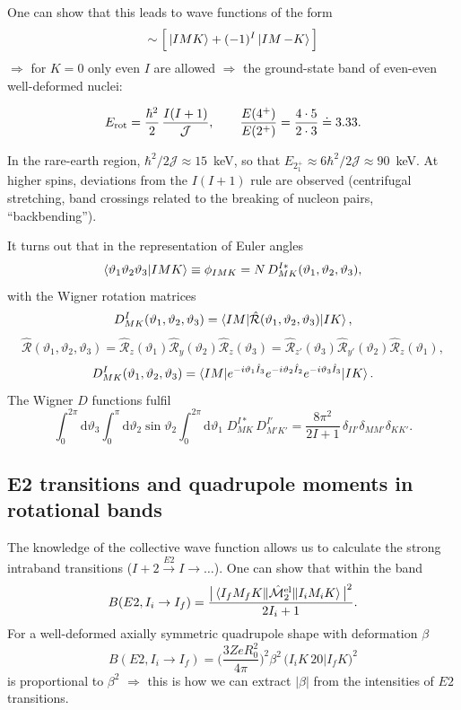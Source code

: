 \documentclass[11pt,a4paper]{article}
\newcommand{\op}[1]{\hat{#1}}
\newcommand{\ud}{\mathrm{d}}
\begin{document}
One can show that this leads to wave functions of the form
\[
\sim\Big[\ket{IMK}+(-1)^I\ket{IM\,{-K}}\Big]
\]
$\Rightarrow$ for $K=0$ only even $I$ are allowed $\Rightarrow$ the ground-state band of even-even well-deformed nuclei:
\begin{center}
\end{center}
\[
E_{\rm rot}=\frac{\hbar^2}{2}\,\frac{I(I+1)}{\mathcal J},\qquad
\frac{E(4^+)}{E(2^+)}=\frac{4\cdot5}{2\cdot3}\doteq3.33 .
\]

In the rare-earth region, $\hbar^2/2\mathcal J\approx15$~keV, so that $E_{2^+_1}\approx6\hbar^2/2\mathcal J\approx90$~keV. At higher spins, deviations from the $I(I+1)$ rule are observed (centrifugal stretching, band crossings related to the breaking of nucleon pairs, ``backbending'').

It turns out that in the representation of Euler angles
\[
\braket{\vartheta_1\vartheta_2\vartheta_3|IMK}\equiv\phi_{IMK}=N\,D^{I*}_{MK}(\vartheta_1,\vartheta_2,\vartheta_3),
\]
with the Wigner rotation matrices
\[
D^I_{MK}(\vartheta_1,\vartheta_2,\vartheta_3)=\braket{IM|\op{\mathcal R}(\vartheta_1,\vartheta_2,\vartheta_3)|IK},
\]
\[
\op{\mathcal R}(\vartheta_1,\vartheta_2,\vartheta_3)=\op{\mathcal R}_z(\vartheta_1)\op{\mathcal R}_y(\vartheta_2)\op{\mathcal R}_z(\vartheta_3)
=\op{\mathcal R}_{z'}(\vartheta_3)\op{\mathcal R}_{y'}(\vartheta_2)\op{\mathcal R}_z(\vartheta_1),
\]
\[
D^I_{MK}(\vartheta_1,\vartheta_2,\vartheta_3)=\braket{IM|e^{-i\vartheta_1\op I_3}e^{-i\vartheta_2\op I_2}e^{-i\vartheta_3\op I_3}|IK}.
\]
The Wigner $D$ functions fulfil
\[
\int_0^{2\pi}\ud\vartheta_3\int_0^\pi\ud\vartheta_2\sin\vartheta_2\int_0^{2\pi}\ud\vartheta_1\;D^{I*}_{MK}\,D^{I'}_{M'K'}=\frac{8\pi^2}{2I+1}\,\delta_{II'}\delta_{MM'}\delta_{KK'} .
\]

\subsection{E2 transitions and quadrupole moments in rotational bands}
The knowledge of the collective wave function allows us to calculate the strong intraband transitions ($I+2\xrightarrow{E2}I\to\dots$). One can show that within the band
\[
B(E2,I_i\to I_f)=\frac{\big|\braket{I_fM_fK\|\op{\mathcal M}^{\rm el}_2\|I_iM_iK}\big|^2}{2I_i+1}.
\]
For a well-deformed axially symmetric quadrupole shape with deformation $\beta$
\[
B(E2,I_i\to I_f)=\Big(\frac{3ZeR_0^2}{4\pi}\Big)^2\beta^2\,\big(I_iK\,20\big|I_fK\big)^2
\]
is proportional to $\beta^2$ $\Rightarrow$ this is how we can extract $|\beta|$ from the intensities of $E2$ transitions.
\end{document}
